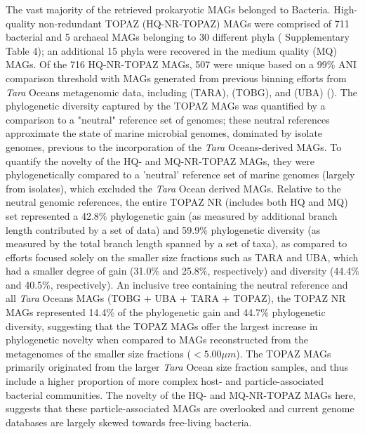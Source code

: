 \documentclass[12pt]{article}
\numberwithin{equation}{section}
\begin{document}
The vast majority of the retrieved prokaryotic MAGs belonged to Bacteria. High-quality non-redundant TOPAZ (HQ-NR-TOPAZ) MAGs were comprised of 711 bacterial and 5 archaeal MAGs belonging to 30 different phyla ( Supplementary Table 4); an additional 15 phyla were recovered in the medium quality (MQ) MAGs. Of the 716 HQ-NR-TOPAZ MAGs, 507 were unique based on a 99\% ANI comparison threshold with MAGs generated from previous binning efforts from \textit{Tara} Oceans metagenomic data, including \citet{Delmont2018Nitrogen-fixing} (TARA), \citet{Tully2018reconstruction} (TOBG), and \citet{Parks2017Recovery} (UBA) (). The phylogenetic diversity captured by the TOPAZ MAGs was quantified by a comparison to a "neutral" reference set of genomes; these neutral references approximate the state of marine microbial genomes, dominated by isolate genomes, previous to the incorporation of the \textit{Tara} Oceans-derived MAGs. To quantify the novelty of the HQ- and MQ-NR-TOPAZ MAGs, they were phylogenetically compared to a 'neutral' reference set of marine genomes (largely from isolates), which excluded the \textit{Tara} Ocean derived MAGs. Relative to the neutral genomic references, the entire TOPAZ NR (includes both HQ and MQ) set represented a 42.8\% phylogenetic gain (as measured by additional branch length contributed by a set of data) and 59.9\% phylogenetic diversity (as measured by the total branch length spanned by a set of taxa), as compared to efforts focused solely on the smaller size fractions such as TARA and UBA, which had a smaller degree of gain (31.0\% and 25.8\%, respectively) and diversity (44.4\% and 40.5\%, respectively). An inclusive tree containing the neutral reference and all \textit{Tara} Oceans MAGs (TOBG + UBA + TARA + TOPAZ), the TOPAZ NR MAGs represented 14.4\% of the phylogenetic gain and 44.7\% phylogenetic diversity, suggesting that the TOPAZ MAGs offer the largest increase in phylogenetic novelty when compared to MAGs reconstructed from the metagenomes of the smaller size fractions ($<5.00 \mu m$). The TOPAZ MAGs primarily originated from the larger \textit{Tara} Ocean size fraction samples, and thus include a higher proportion of more complex host- and particle-associated bacterial communities. The novelty of the HQ- and MQ-NR-TOPAZ MAGs here, suggests that these particle-associated MAGs are overlooked and current genome databases are largely skewed towards free-living bacteria.

\end{document}
